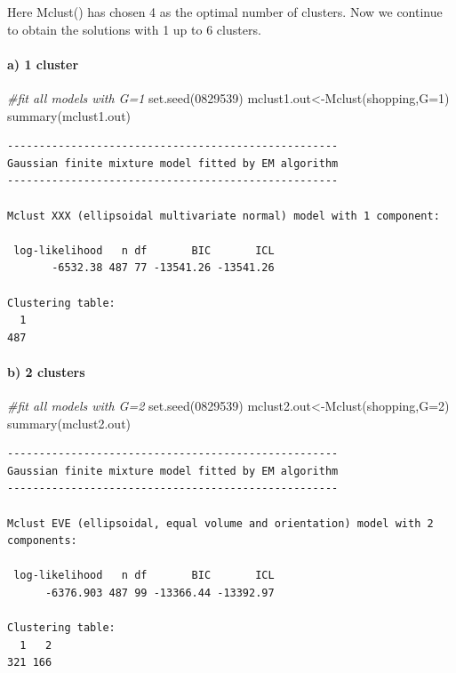 \documentclass[
  11pt,
]{article}
\newenvironment{Shaded}{\begin{snugshade}}{\end{snugshade}}
\newcommand{\AttributeTok}[1]{\textcolor[rgb]{0.77,0.63,0.00}{#1}}
\newcommand{\CommentTok}[1]{\textcolor[rgb]{0.56,0.35,0.01}{\textit{#1}}}
\newcommand{\DecValTok}[1]{\textcolor[rgb]{0.00,0.00,0.81}{#1}}
\newcommand{\FunctionTok}[1]{\textcolor[rgb]{0.00,0.00,0.00}{#1}}
\newcommand{\NormalTok}[1]{#1}
\newcommand{\OtherTok}[1]{\textcolor[rgb]{0.56,0.35,0.01}{#1}}
\begin{document}
Here Mclust() has chosen 4 as the optimal number of clusters. Now we continue to obtain the solutions with 1 up to 6 clusters.

\hypertarget{a-1-cluster-2}{%
\paragraph{a) 1 cluster}\label{a-1-cluster-2}}

\begin{Shaded}
\begin{Highlighting}[]
\CommentTok{\#fit all models with G=1}
\FunctionTok{set.seed}\NormalTok{(}\DecValTok{0829539}\NormalTok{)}
\NormalTok{mclust1.out}\OtherTok{\textless{}{-}}\FunctionTok{Mclust}\NormalTok{(shopping,}\AttributeTok{G=}\DecValTok{1}\NormalTok{)}
\FunctionTok{summary}\NormalTok{(mclust1.out)}
\end{Highlighting}
\end{Shaded}

\begin{verbatim}
---------------------------------------------------- 
Gaussian finite mixture model fitted by EM algorithm 
---------------------------------------------------- 

Mclust XXX (ellipsoidal multivariate normal) model with 1 component: 

 log-likelihood   n df       BIC       ICL
       -6532.38 487 77 -13541.26 -13541.26

Clustering table:
  1 
487 
\end{verbatim}

\hypertarget{b-2-clusters-1}{%
\paragraph{b) 2 clusters}\label{b-2-clusters-1}}

\begin{Shaded}
\begin{Highlighting}[]
\CommentTok{\#fit all models with G=2}
\FunctionTok{set.seed}\NormalTok{(}\DecValTok{0829539}\NormalTok{)}
\NormalTok{mclust2.out}\OtherTok{\textless{}{-}}\FunctionTok{Mclust}\NormalTok{(shopping,}\AttributeTok{G=}\DecValTok{2}\NormalTok{)}
\FunctionTok{summary}\NormalTok{(mclust2.out)}
\end{Highlighting}
\end{Shaded}

\begin{verbatim}
---------------------------------------------------- 
Gaussian finite mixture model fitted by EM algorithm 
---------------------------------------------------- 

Mclust EVE (ellipsoidal, equal volume and orientation) model with 2 components: 

 log-likelihood   n df       BIC       ICL
      -6376.903 487 99 -13366.44 -13392.97

Clustering table:
  1   2 
321 166 
\end{verbatim}
\end{document}
